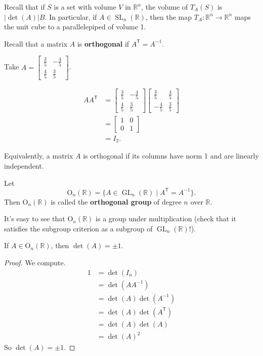 Recall that if $S$ is a set with volume $V$ in $\mathbb R^n$, the volume of $T_A(S)$ is $|{\det(A)}|B$. In particular, if $A\in\operatorname{SL}_n(\mathbb R)$, then the map $T_A\colon\mathbb R^n\to\mathbb R^n$ maps the unit cube to a parallelepiped of volume 1.

Recall that a matrix $A$ is \textbf{orthogonal} if $A^\mathsf T=A^{-1}$.

\begin{example}
	Take $A=\begin{bmatrix}
		\frac 35 & -\frac 45 \\ \frac 45 & \frac 35
	\end{bmatrix}$.

	\begin{align*}
		AA^\mathsf{T}&=\begin{bmatrix}
		\frac 35 & -\frac 45 \\ \frac 45 & \frac 35
	\end{bmatrix}\begin{bmatrix}
		\frac 35 & \frac 45 \\ -\frac 45 & \frac 35
	\end{bmatrix}\\
	&=\begin{bmatrix}
		1 & 0 \\ 0 & 1
	\end{bmatrix}\\
	&=I_2.
	\end{align*}
\end{example}

Equivalently, a matrix $A$ is orthogonal if its columns have norm 1 and are linearly independent.

\begin{definition}
	Let
	$$\mathrm{O}_n(\mathbb R)=\{A\in\operatorname{GL}_n(\mathbb R)\mid A^\mathsf{T}=A^{-1}\}.$$
	Then $\mathrm{O}_n(\mathbb R)$ is called the \textbf{orthogonal group} of degree $n$ over $\mathbb R$.
\end{definition}

It's easy to see that $\mathrm{O}_n(\mathbb R)$ is a group under multiplication (check that it satisfies the subgroup criterion as a subgroup of $\operatorname{GL}_n(\mathbb R)$!).

\begin{proposition}
	If $A\in\mathrm{O}_n(\mathbb R)$, then $\det(A)=\pm 1$.
\end{proposition}

\begin{proof}
	We compute.
	\begin{align*}
		1&=\det(I_n)\\
		&=\det(AA^{-1})\\
		&=\det(A)\det(A^{-1})\\
		&=\det(A)\det(A^\mathsf{T})\\
		&=\det(A)\det(A)\\
		&=\det(A)^2
	\end{align*}
	So $\det(A)=\pm 1$.
\end{proof}

